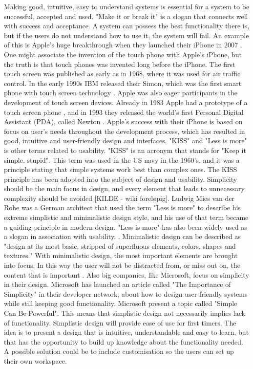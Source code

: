 Making good, intuitive, easy to understand systems is essential for a system to be successful, accepted and used. "Make it or break it" is a slogan that connects well with success and acceptance. A system can possess the best functionality there is, but if the users do not understand how to use it, the system will fail. An example of this is Apple's huge breakthrough when they launched their iPhone in 2007 \cite{iphone2007}. One might associate the invention of the touch phone with Apple's iPhone, but the truth is that touch phones was invented long before the iPhone. The first touch screen was published as early as in 1968, where it was used for air traffic control. In the early 1990s IBM released their Simon, which was the first smart phone with touch screen technology \cite{touchphone}. Apple was also eager participants in the development of touch screen devices. Already in 1983 Apple had a prototype of a touch screen phone \cite{applefirst1983}, and in 1993 they released the world's first Personal Digital Assistant (PDA), called Newton \cite{touchphone}. Apple’s success with their iPhone is based on focus on user’s needs throughout the development process, which has resulted in good, intuitive and user-friendly design and interfaces. "KISS" and "Less is more" is other terms related to usability. "KISS" is an acronym that stands for "Keep it simple, stupid". This term was used in the US navy in the 1960's, and it was a principle stating that simple systems work best than complex ones. The KISS principle has been adopted into the subject of design and usability. Simplicity should be the main focus in design, and every element that leads to unnecessary complexity should be avoided [KILDE - wiki foreløpig]. Ludwig Mies van der Rohe was a German architect that used the term "Less is more" to describe his extreme simplistic and minimalistic design style, and his use of that term became a guiding principle in modern design. "Less is more" has also been widely used as a slogan in association with usability. \cite{rohe}. Minimalistic design can be described as "design at its most basic, stripped of superfluous elements, colors, shapes and textures." With minimalistic design, the most important elements are brought into focus. In this way the user will not be distracted from, or miss out on, the content that is important \cite{lessismore}. Also big companies, like Microsoft, focus on simplicity in their design. Microsoft has launched an article called "The Importance of Simplicity" in their developer network, about how to design user-friendly systems while still keeping good functionality. Microsoft present a topic called "Simple Can Be Powerful". This means that simplistic design not necessarily implies lack of functionality. Simplistic design will provide ease of use for first timers. The idea is to present a design that is intuitive, understandable and easy to learn, but that has the opportunity to build up knowledge about the functionality needed. A possible solution could be to include customisation so the users can set up their own workspace.             

